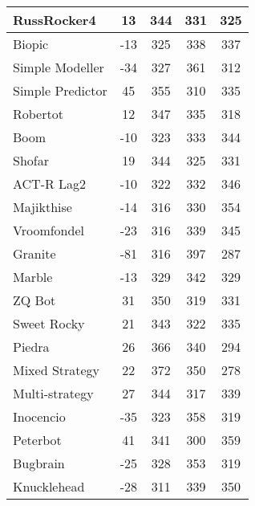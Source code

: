 \begin{table}
\begin{tabular}{|l|c|c|c|c|}
RussRocker4 & 13 & 344 & 331 & 325 \\ \hline 
Biopic & -13 & 325 & 338 & 337 \\ \hline 
Simple Modeller & -34 & 327 & 361 & 312 \\ \hline 
Simple Predictor & 45 & 355 & 310 & 335 \\ \hline 
Robertot & 12 & 347 & 335 & 318 \\ \hline 
Boom & -10 & 323 & 333 & 344 \\ \hline 
Shofar & 19 & 344 & 325 & 331 \\ \hline 
ACT-R Lag2 & -10 & 322 & 332 & 346 \\ \hline 
Majikthise & -14 & 316 & 330 & 354 \\ \hline 
Vroomfondel & -23 & 316 & 339 & 345 \\ \hline 
Granite & -81 & 316 & 397 & 287 \\ \hline 
Marble & -13 & 329 & 342 & 329 \\ \hline 
ZQ Bot & 31 & 350 & 319 & 331 \\ \hline 
Sweet Rocky & 21 & 343 & 322 & 335 \\ \hline 
Piedra & 26 & 366 & 340 & 294 \\ \hline 
Mixed Strategy & 22 & 372 & 350 & 278 \\ \hline 
Multi-strategy & 27 & 344 & 317 & 339 \\ \hline 
Inocencio & -35 & 323 & 358 & 319 \\ \hline 
Peterbot & 41 & 341 & 300 & 359 \\ \hline 
Bugbrain & -25 & 328 & 353 & 319 \\ \hline 
Knucklehead & -28 & 311 & 339 & 350 \\ \hline
        \end{tabular}
    \end{table}